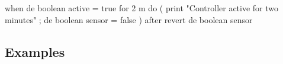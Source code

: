 \documentclass{crescendorepchap}
\begin{document}
\begin{dcl}
when de boolean active = true for 2 {m} do
  ( print "Controller active for two minutes" ;
    de boolean sensor = false )
after
  revert de boolean sensor
\end{dcl}











\subsection{Examples}
\end{document}
